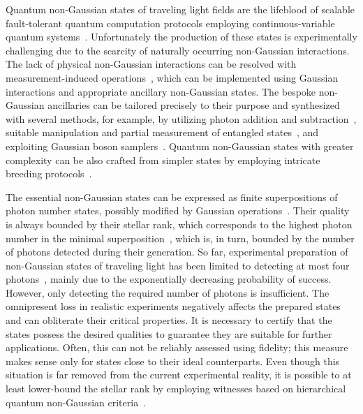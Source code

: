 \documentclass{article}
\begin{document}
Quantum non-Gaussian states of traveling light fields are the lifeblood of scalable fault-tolerant quantum computation protocols employing continuous-variable quantum systems~\cite{lloyd1999,gottesman2001,menicucci2014,baragiola2019,bourassa2021,madsen2022,aghaeerad2025}. Unfortunately the production of these states is experimentally challenging due to the scarcity of naturally occurring non-Gaussian interactions. The lack of physical non-Gaussian interactions can be resolved with measurement-induced operations~\cite{filip2005,marek2009,marek2011,yukawa2013b,miyata2016,marek2018a,sakaguchi2023}, which can be implemented using Gaussian interactions and appropriate ancillary non-Gaussian states. The bespoke non-Gaussian ancillaries can be tailored precisely to their purpose and synthesized with several methods, for example, by utilizing photon addition and subtraction~\cite{dakna1999,fiurasek2005,eaton2019,takase2021,endo2023}, suitable manipulation and partial measurement of entangled states~\cite{yukawa2013a,yoshikawa2018,tiedau2019,provaznik2020}, and exploiting Gaussian boson samplers~\cite{su2019,quesada2019}. Quantum non-Gaussian states with greater complexity can be also crafted from simpler states by employing intricate breeding protocols~\cite{weigand2018,eaton2022,zheng2023,takase2024,aghaeerad2025}. %

The essential non-Gaussian states can be expressed as finite superpositions of photon number states, possibly modified by Gaussian operations~\cite{walschaers2021,lachman2019,fiurasek2022}. Their quality is always bounded by their stellar rank, which corresponds to the highest photon number in the minimal superposition~\cite{walschaers2021,lachman2019,fiurasek2022}, which is, in turn, bounded by the number of photons detected during their generation. So far, experimental preparation of non-Gaussian states of traveling light has been limited to detecting at most four photons~\cite{engelkemeier2021,endo2025}, mainly due to the exponentially decreasing probability of success.
%
However, only detecting the required number of photons is insufficient. The omnipresent loss in realistic experiments negatively affects the prepared states and can obliterate their critical properties. It is necessary to certify that the states possess the desired qualities to guarantee they are suitable for further applications. Often, this can not be reliably assessed using fidelity; this measure makes sense only for states close to their ideal counterparts. Even though this situation is far removed from the current experimental reality, it is possible to at least lower-bound the stellar rank by employing witnesses based on hierarchical quantum non-Gaussian criteria~\cite{lachman2019,fiurasek2022}.
\end{document}
